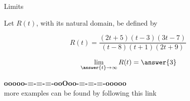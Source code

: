 \documentclass{ximera}
\begin{document}
\begin{example} Limits 



Let $R(t)$, with its natural domain, be defined by 



\[
  R(t) = \frac{(2t+5)(t-3)(3t-7)}{(t-8)(t+1)(2t+9)} \,
\]





\[   \lim_{\answer{t} \to \infty} R(t)   = \answer{3}     \]






\end{example}










\begin{onlineOnly}
\begin{center}
\textbf{\textcolor{green!50!black}{ooooo-=-=-=-ooOoo-=-=-=-ooooo}} \\

more examples can be found by following this link\\ 

\end{center}
\end{onlineOnly}
\end{document}

